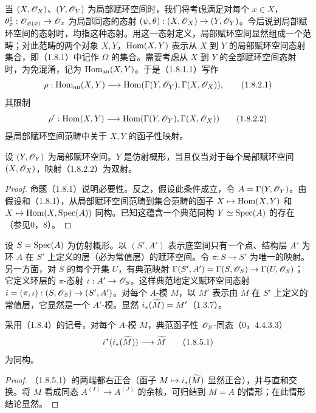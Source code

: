 当 $(X,\mathscr O_X)$、$(Y,\mathscr O_Y)$ 为局部赋环空间时，我们将考虑满足对每个 $x\in X$，$\theta_x^\sharp:\mathscr O_{\psi(x)}\to\mathscr O_x$ 为局部同态的态射 $(\psi,\theta):(X,\mathscr O_X)\to(Y,\mathscr O_Y)$。今后说到局部赋环空间的态射时，均指这种态射。用这一态射定义，局部赋环空间显然组成一个范畴；对此范畴的两个对象 $X,Y$，$\operatorname{Hom}(X,Y)$ 表示从 $X$ 到 $Y$ 的局部赋环空间态射集合，即（1.8.1）中记作 $\Omega$ 的集合。需要考虑从 $X$ 到 $Y$ 的全部赋环空间态射时，为免混淆，记为 $\operatorname{Hom}_{\mathrm{an}}(X,Y)$。于是（1.8.1.1）写作
\begin{equation}
\rho:\operatorname{Hom}_{\mathrm{an}}(X,Y)\longrightarrow
\operatorname{Hom}(\Gamma(Y,\mathscr O_Y),\Gamma(X,\mathscr O_X)),\tag{1.8.2.1}
\end{equation}
其限制
\begin{equation}
\rho':\operatorname{Hom}(X,Y)\longrightarrow
\operatorname{Hom}(\Gamma(Y,\mathscr O_Y),\Gamma(X,\mathscr O_X))\tag{1.8.2.2}
\end{equation}
是局部赋环空间范畴中关于 $X,Y$ 的函子性映射。

设 $(Y,\mathscr O_Y)$ 为局部赋环空间。$Y$ 是仿射概形，当且仅当对于每个局部赋环空间 $(X,\mathscr O_X)$，映射（1.8.2.2）为双射。
\begin{proof}
命题（1.8.1）说明必要性。反之，假设此条件成立，令 $A=\Gamma(Y,\mathscr O_Y)$。由假设和（1.8.1），从局部赋环空间范畴到集合范畴的函子 $X\mapsto\operatorname{Hom}(X,Y)$ 和 $X\mapsto\operatorname{Hom}(X,\operatorname{Spec}(A))$ 同构。已知这蕴含一个典范同构 $Y\simeq\operatorname{Spec}(A)$ 的存在（参见0，8）。
\end{proof}

设 $S=\operatorname{Spec}(A)$ 为仿射概形。以 $(S',A')$ 表示底空间只有一个点、结构层 $A'$ 为环 $A$ 在 $S'$ 上定义的层（必为常值层）的赋环空间。令 $\pi:S\to S'$ 为唯一的映射。另一方面，对 $S$ 的每个开集 $U$，有典范映射
$\Gamma(S',A')=\Gamma(S,\mathscr O_S)\to\Gamma(U,\mathscr O_S)$；它定义环层的 $\pi$-态射 $\iota:A'\to\mathscr O_S$。这样典范地定义赋环空间态射 $i=(\pi,\iota):(S,\mathscr O_S)\to(S',A')$。对每个 $A$-模 $M$，以 $M'$ 表示由 $M$ 在 $S'$ 上定义的常值层，它显然是一个 $A'$-模。显然 $i_*(\widetilde{M})=M'$（1.3.7）。

采用（1.8.4）的记号，对每个 $A$-模 $M$，典范函子性 $\mathscr O_S$-同态（0，4.4.3.3）
\begin{equation}i^*(i_*(\widetilde{M}))\longrightarrow\widetilde{M}\tag{1.8.5.1}\end{equation}
为同构。
\begin{proof}
（1.8.5.1）的两端都右正合（函子 $M\mapsto i_*(\widetilde{M})$ 显然正合），并与直和交换。将 $M$ 看成同态 $A^{(I)}\to A^{(J)}$ 的余核，可归结到 $M=A$ 的情形；在此情形结论显然。
\end{proof}

